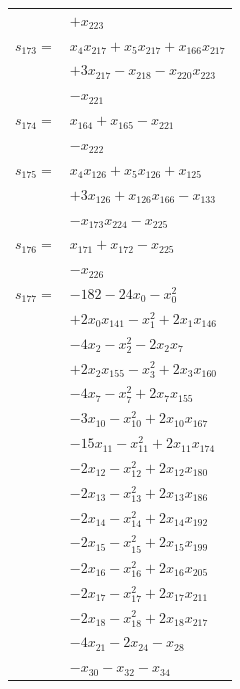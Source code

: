 \begin{longtable}{@{}r@{\;}l@{}}
 & \(\displaystyle +x_{223}\) \\[3pt]
\(s_{173}=\) & \(\displaystyle x_{4}x_{217} +x_{5}x_{217} +x_{166}x_{217}\) \\
 & \(\displaystyle +3x_{217} -x_{218} -x_{220}x_{223}\) \\
 & \(\displaystyle -x_{221}\) \\[3pt]
\(s_{174}=\) & \(\displaystyle x_{164} +x_{165} -x_{221}\) \\
 & \(\displaystyle -x_{222}\) \\[3pt]
\(s_{175}=\) & \(\displaystyle x_{4}x_{126} +x_{5}x_{126} +x_{125}\) \\
 & \(\displaystyle +3x_{126} +x_{126}x_{166} -x_{133}\) \\
 & \(\displaystyle -x_{173}x_{224} -x_{225}\) \\[3pt]
\(s_{176}=\) & \(\displaystyle x_{171} +x_{172} -x_{225}\) \\
 & \(\displaystyle -x_{226}\) \\[3pt]
\(s_{177}=\) & \(\displaystyle -182 -24x_{0} -x_{0}^{2}\) \\
 & \(\displaystyle +2x_{0}x_{141} -x_{1}^{2} +2x_{1}x_{146}\) \\
 & \(\displaystyle -4x_{2} -x_{2}^{2} -2x_{2}x_{7}\) \\
 & \(\displaystyle +2x_{2}x_{155} -x_{3}^{2} +2x_{3}x_{160}\) \\
 & \(\displaystyle -4x_{7} -x_{7}^{2} +2x_{7}x_{155}\) \\
 & \(\displaystyle -3x_{10} -x_{10}^{2} +2x_{10}x_{167}\) \\
 & \(\displaystyle -15x_{11} -x_{11}^{2} +2x_{11}x_{174}\) \\
 & \(\displaystyle -2x_{12} -x_{12}^{2} +2x_{12}x_{180}\) \\
 & \(\displaystyle -2x_{13} -x_{13}^{2} +2x_{13}x_{186}\) \\
 & \(\displaystyle -2x_{14} -x_{14}^{2} +2x_{14}x_{192}\) \\
 & \(\displaystyle -2x_{15} -x_{15}^{2} +2x_{15}x_{199}\) \\
 & \(\displaystyle -2x_{16} -x_{16}^{2} +2x_{16}x_{205}\) \\
 & \(\displaystyle -2x_{17} -x_{17}^{2} +2x_{17}x_{211}\) \\
 & \(\displaystyle -2x_{18} -x_{18}^{2} +2x_{18}x_{217}\) \\
 & \(\displaystyle -4x_{21} -2x_{24} -x_{28}\) \\
 & \(\displaystyle -x_{30} -x_{32} -x_{34}\) \\

\end{longtable}
